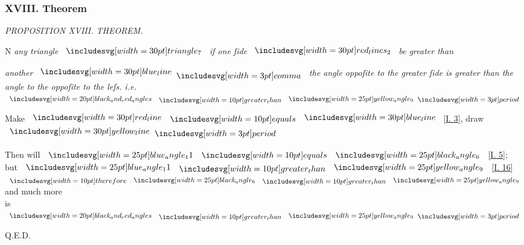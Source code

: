 \documentclass[11pt,preview]{standalone}
\begin{document}
\subsubsection{XVIII. Theorem}

\hfill

\begin{minipage}[t]{0.43\textwidth}
    \vspace{20pt}
    
\end{minipage}%
\hfill
\begin{minipage}[t]{0.55\textwidth}
    \begin{center}
        \textit{PROPOSITION XVIII. THEOREM.}\label{book1pr18} \\
    \end{center}

    \hfill

    \begin{center}
        \raggedright \lettrine[lines=3, loversize=1, nindent=0pt]{}{}N \textit{any triangle} $\img[0][0][30]{triangle_7}$ \textit{if one ſide} $\img[0.5][0][30]{red_lines_2}$ \textit{be greater than}
    \end{center}
    \textit{another} $\blueline \bcomma$ \textit{the angle oppoſite to the greater ſide is greater than the angle to the oppoſite to the leſs. i.e.} $\img[0][0][20]{black_and_red_angles} \bgt \img{yellow_angle_9} \bperiod$
\end{minipage}

\hfill

\hfill

{\vspace{1ex}\begin{center}
        Make $\redline \bequals \blueline$ [\hyperref[book1pr3]{\textsc{I.} 3}], draw $\yellowline \bperiod$
    \end{center}}

\hfill

\begin{center}
    Then will $\img{blue_angle_11} \bequals \img{black_angle_6}$ [\hyperref[book1pr5]{\textsc{I.} 5}];\\
    but $\img{blue_angle_11} \bgt \img{yellow_angle_9}$ [\hyperref[book1pr16]{\textsc{I.} 16}]\\
    $\btherefore \img{black_angle_6} \bgt \img{yellow_angle_9}$ and much more\\
    is $\img[0][0][20]{black_and_red_angles} \bgt \img{yellow_angle_9} \bperiod$
\end{center}

\hfill

\hfill Q.E.D.
\end{document}
